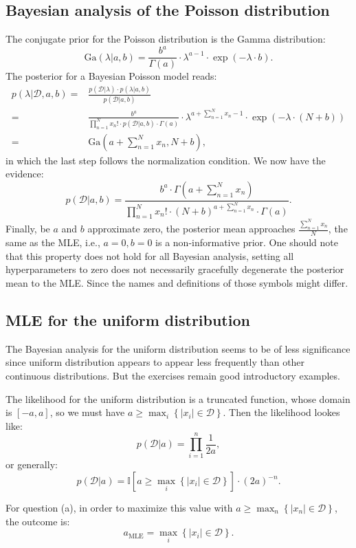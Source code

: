 \documentclass[UTF8]{ctexart}
\begin{document}
\subsection{Bayesian analysis of the Poisson distribution}
The conjugate prior for the Poisson distribution is the Gamma distribution:
$$\text{Ga}(\lambda|a,b)=\frac{b^{a}}{\Gamma(a)}\cdot\lambda^{a-1}\cdot\exp(-\lambda\cdot b).$$
The posterior for a Bayesian Poisson model reads:
$$
\begin{aligned}
p(\lambda|\mathcal{D},a,b)=& \frac{p(\mathcal{D}|\lambda)\cdot p(\lambda|a,b)}{p(\mathcal{D}|a,b)}\\
=& \frac{b^{a}}{\prod_{n=1}^{N}x_{n}!\cdot p(\mathcal{D}|a,b)\cdot\Gamma(a)}\cdot\lambda^{a+\sum_{n=1}^{N}x_{n}-1}\cdot\exp\left(-\lambda\cdot (N+b)\right) \\
 =& \text{Ga}(a+\sum_{n=1}^{N} x_{n}, N+b),
\end{aligned}
$$
in which the last step follows the normalization condition.
We now have the evidence:
$$p(\mathcal{D}|a,b)=\frac{b^{a}\cdot\Gamma(a+\sum_{n=1}^{N}x_{n})}{\prod_{n=1}^{N}x_{n}!\cdot(N+b)^{a+\sum_{n=1}^{N}x_{n}}\cdot\Gamma(a)}.$$
Finally, be $a$ and $b$ approximate zero, the posterior mean approaches $\frac{\sum_{n=1}^{N}x_{n}}{N}$, the same as the MLE, i.e., $a=0,b=0$ is a non-informative prior.
One should note that this property does not hold for all Bayesian analysis, setting all hyperparameters to zero does not necessarily gracefully degenerate the posterior mean to the MLE.
Since the names and definitions of those symbols might differ.

\subsection{MLE for the uniform distribution}
The Bayesian analysis for the uniform distribution seems to be of less significance since uniform distribution appears to appear less frequently than other continuous distributions.
But the exercises remain good introductory examples.

The likelihood for the uniform distribution is a truncated function, whose domain is $[-a,a]$, so we must have $a\geq \max_{i}\left\{ |x_{i}|\in\mathcal{D}\right\}$.
Then the likelihood lookes like:
$$p(\mathcal{D}|a)=\prod_{i=1}^{n}\frac{1}{2a},$$
or generally:
$$p(\mathcal{D}|a)=\mathbb{I}[a\geq \max_{i}\left\{ |x_{i}|\in\mathcal{D}\right\}]\cdot (2a)^{-n}.$$

For question (a), in order to maximize this value with $a\geq \max_{n}\left\{ |x_{n}|\in\mathcal{D}\right\}$, the outcome is:
$$a_{\text{MLE}}=\max_{i}\left\{ |x_{i}|\in\mathcal{D}\right\}.$$
\end{document}
